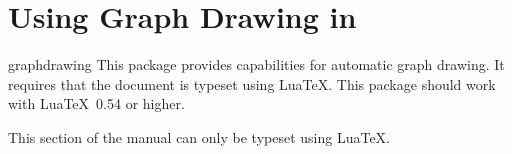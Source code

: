 %
%
%


\section{Using Graph Drawing in \tikzname}

{}

\begin{tikzlibrary}{graphdrawing}
    This package provides capabilities for automatic graph drawing. It requires
    that the document is typeset using Lua\TeX. This package should work with
    Lua\TeX\ 0.54 or higher.
\end{tikzlibrary}

\ifluatex
\else
    This section of the manual can only be typeset using Lua\TeX.
    \expandafter\endinput
\fi


\subsection{Choosing a Layout and a Library}

The graph drawing engine is initialized when you load the library
|graphdrawing|. This library provides the basic framework for graph drawing,
including all options and keys described in the present section. However, this
library does \emph{not} load any actual algorithms for drawing graphs. For
this, you need to use the following command, which is defined by the
|graphdrawing| library:


